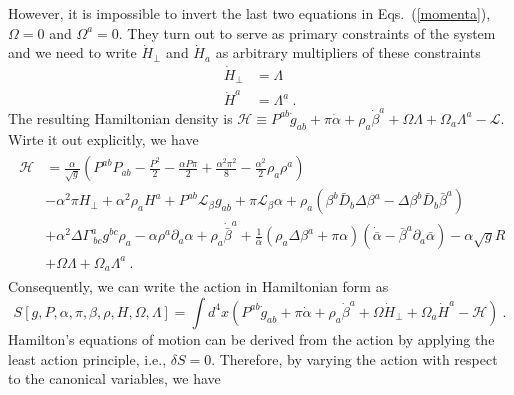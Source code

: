 However, it is impossible to invert the last two equations in Eqs.~(\ref{momenta}), $\Omega = 0$ and $\Omega^{a} = 0$. They turn out to serve as primary constraints of the system and we need to write ${\dot H}_{\perp}$ and ${\dot H}_{a}$ as arbitrary multipliers of these constraints
\begin{subequations}
\begin{align}
{\dot H}_{\perp} & = \Lambda\\
{\dot H}^{a} & = \Lambda^{a} \ .
\end{align}
\end{subequations}
The resulting Hamiltonian density is $\mathscr{H} \equiv P^{ab}{\dot g}_{ab} + \pi {\dot \alpha} + \rho_{a}{\dot \beta}^{a} + \Omega \Lambda + \Omega_{a}\Lambda^{a} - \mathscr{L}$. Wirte it out explicitly, we have
\begin{align}
\begin{split}
\mathscr{H} &= \frac{\alpha}{\sqrt{g}}\left(P^{ab}P_{ab} - \frac{P^{2}}{2} - \frac{\alpha P \pi}{2} + \frac{\alpha^{2}\pi^{2}}{8} - \frac{\alpha^{2}}{2}\rho_{a}\rho^{a}\right)\\
& -\alpha^{2}\pi H_{\perp} + \alpha^{2}\rho_{a}H^{a} + P^{ab} \mathcal{L}_{\beta}g_{ab} + \pi \mathcal{L}_{\beta}\alpha + \rho_{a}\left(\beta^{b}{\bar D}_{b}\Delta \beta^{a} - \Delta \beta^{b} {\bar D}_{b}{\bar \beta}^{a}\right)\\
& + \alpha^{2}\Delta\Gamma^{a}_{~bc}g^{bc}\rho_{a} - \alpha \rho^{a}\partial_{a}\alpha + \rho_{a}{\dot {\bar \beta}}^{a} + \frac{1}{{\bar \alpha}}\left(\rho_{a}\Delta \beta^{a} + \pi \alpha \right)\left({\dot {\bar \alpha}} - {\bar \beta}^{a}\partial_{a}{\bar \alpha}\right) - \alpha\sqrt{g}R\\
& + \Omega \Lambda + \Omega_{a}\Lambda^{a} \ .
\end{split}
\end{align}
Consequently, we can write the action in Hamiltonian form as
\begin{equation}\label{non covariant action}
S[g, P, \alpha, \pi, \beta, \rho, H, \Omega, \Lambda ] = \int d^{4}x \left(P^{ab}{\dot g}_{ab} + \pi {\dot \alpha} + \rho_{a}{\dot \beta}^{a} + \Omega{\dot H_{\perp}} + \Omega_{a}{\dot H}^{a} - \mathscr{H}\right) \ .
\end{equation}
Hamilton's equations of motion can be derived from the action by applying the least action principle, i.e., $\delta S = 0$. Therefore, by varying the action with respect to the canonical variables, we have
